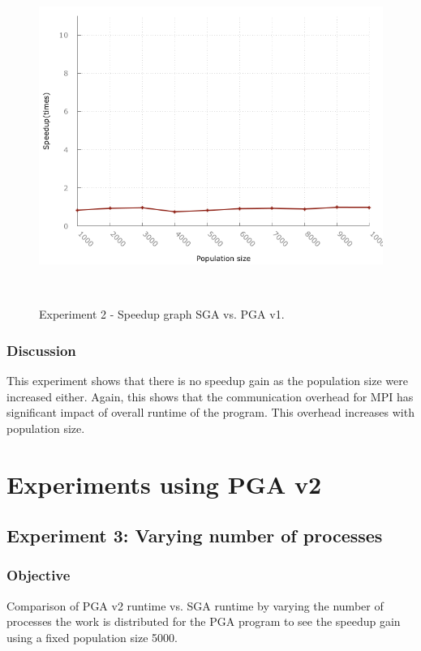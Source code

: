 \begin{figure}[H]
\begin{center}
  \includegraphics[width=.7 \linewidth]{stats_data_new/graphs/pga_xPop_line.png}
  \caption{Experiment 2 - Speedup graph SGA vs. PGA v1.}
  \end{center}\
\end{figure}

\subsubsection{Discussion}
This experiment shows that there is no speedup gain as the population size were increased either. Again, this shows that the communication overhead for MPI has significant impact of overall runtime of the program. This overhead increases with population size.

\section{Experiments using PGA v2}

\subsection{Experiment 3: Varying number of processes}

\subsubsection{Objective}
Comparison of PGA v2 runtime vs. SGA runtime by varying the number of processes the work is distributed for the PGA program to see the speedup gain using a fixed population size 5000.

